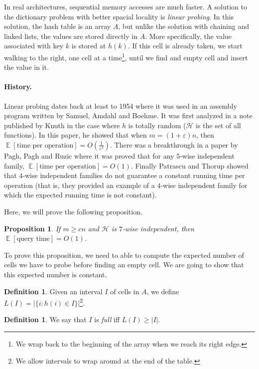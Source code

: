 \documentclass[11pt]{article}
\DeclareMathOperator*{\E}{\mathbb{E}}
\newcommand{\eps}{\varepsilon}
\renewcommand{\H}{\mathcal{H}}
\newtheorem{proposition}[theorem]{Proposition}
\theoremstyle{definition}
\newtheorem{definition}[theorem]{Definition}
\begin{document}
In real architectures, sequential memory accesses are much faster. A solution
to the dictionary problem with better spacial locality is \emph{linear
probing}. In this solution, the hash table is an array $A$, but unlike the
solution with chaining and linked lists, the values are stored directly in
$A$. More specifically, the value associated with key $k$ is stored at $h(k)$.
If this cell is already taken, we start walking to the right, one cell at
a time\footnote{We wrap back to the beginning of the array when we reach its
right edge.}, until we find and empty cell and insert the value in it.

\paragraph{History.} Linear probing dates back at least to 1954 where it was
used in an assembly program written by Samuel, Amdahl and Boehme. It was first
analyzed in a note published by Knuth \cite{Knuth63} in the case where $h$ is
totally random ($\H$ is the set of all functions). In this paper, he showed
that when $m= (1+\eps)n$, then $\E[\text{time per operation}]
= O\left(\frac{1}{\eps^2}\right)$. There was a breakthrough in a paper by Pagh,
Pagh and Ruzic \cite{ppr} where it was proved that for any $5$-wise independent
family, $\E[\text{time per operation}] = O(1)$. Finally Patrascu and Thorup
\cite{pt} showed that $4$-wise independent families do not guarantee a constant
running time per operation (that is, they provided an example of a $4$-wise
independent family for which the expected running time is not constant).

Here, we will prove the following proposition.

\begin{proposition}\label{prop:unfinished}
    If $m\geq cn$ and $\H$ is $7$-wise independent, then $\E[\text{query time}]
    = O(1)$.
\end{proposition}

To prove this proposition, we need to able to compute the expected number of
cells we have to probe before finding an empty cell. We are going to show
that this expected number is constant.

\begin{definition}
    Given an interval $I$ of cells in $A$, we define $L(I)=|\{i: h(i)\in
    I\}|$\footnote{We allow intervals to wrap around at the end of the table.}.
\end{definition}

\begin{definition}
    We say that $I$ is \emph{full} iff $L(I) \geq |I|$.
\end{definition}
\end{document}
